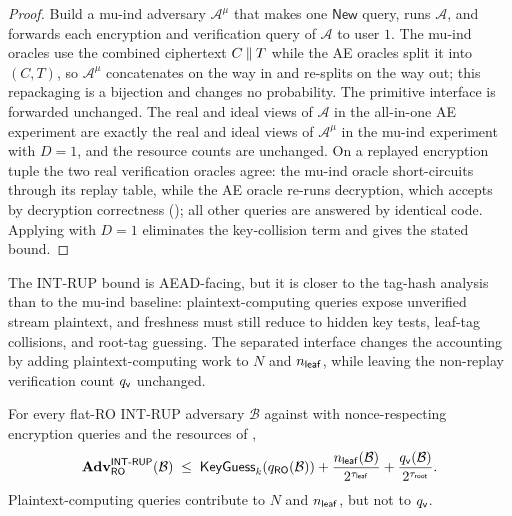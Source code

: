 \begin{proof}
Build a mu-ind adversary $\mathcal{A}^{\mu}$ that makes one
$\mathsf{New}$ query, runs $\mathcal{A}$, and forwards each
encryption and verification query of $\mathcal{A}$ to user $1$. The
mu-ind oracles use the combined ciphertext $C \mathbin{\|} T$ while the AE
oracles split it into $(C, T)$, so $\mathcal{A}^{\mu}$ concatenates on the
way in and re-splits on the way out; this repackaging is a bijection and
changes no probability. The primitive interface is forwarded unchanged. The real and ideal views of
$\mathcal{A}$ in the all-in-one AE experiment are exactly the real and
ideal views of $\mathcal{A}^{\mu}$ in the mu-ind experiment with
$D = 1$, and the resource counts are unchanged. On a replayed
encryption tuple the two real verification oracles agree: the mu-ind
oracle short-circuits through its replay table, while the AE oracle
re-runs decryption, which accepts by \TW{} decryption correctness
(); all other queries are answered by identical
code. Applying
 with $D = 1$ eliminates the key-collision term and
gives the stated bound.
\end{proof}

The \textsf{INT-RUP} bound is AEAD-facing, but it is closer to the tag-hash
analysis than to the mu-ind baseline: plaintext-computing queries expose
unverified stream plaintext, and freshness must still reduce to hidden key
tests, leaf-tag collisions, and root-tag guessing. The separated interface
changes the accounting by adding plaintext-computing work to $N$ and
$n_{\mathsf{leaf}}$, while leaving the non-replay verification count $q_{\mathsf{v}}$ unchanged.

\begin{theorem}
\label{thm:int-rup-ro}
For every flat-RO \textsf{INT-RUP} adversary $\mathcal{B}$ against \TW{}
with nonce-respecting encryption queries and the resources of
,
\[
  \mathbf{Adv}^{\mathsf{INT\text{-}RUP}}_{\mathsf{RO}}(\mathcal{B})
  \;\leq\;
  \mathsf{KeyGuess}_k(q_{\mathsf{RO}}(\mathcal{B}))
  + \frac{n_{\mathsf{leaf}}(\mathcal{B})}{2^{\tau_{\mathsf{leaf}}}}
  + \frac{q_{\mathsf{v}}(\mathcal{B})}{2^{\tau_{\mathsf{root}}}}.
\]
Plaintext-computing queries contribute to $N$ and $n_{\mathsf{leaf}}$, but not to
$q_{\mathsf{v}}$.
\end{theorem}

